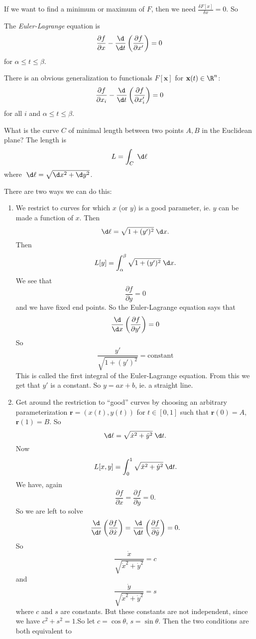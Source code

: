 \documentclass[a4paper]{article}
\begin{document}
If we want to find a minimum or maximum of $F$, then we need $\frac{\delta F[x]}{\delta x} = 0$. So
\begin{defi}
  The \emph{Euler-Lagrange} equation is
  \[
    \frac{\partial f}{\partial x} - \frac{\d}{\d t}\left(\frac{\partial f}{\partial  x'}\right) = 0
  \]
  for $\alpha \leq t \leq \beta$.
\end{defi}
There is an obvious generalization to functionals $F[\mathbf{x}]$  for $\mathbf{x}(t) \in \R^n$:
\[
  \frac{\partial f}{\partial x_i} - \frac{\d }{\d t}\left(\frac{\partial f}{\partial x_i'}\right) = 0
\]
for all $i$ and $\alpha \leq t \leq \beta$.
\begin{eg}
  What is the curve $C$ of minimal length between two points $A, B$ in the Euclidean plane? The length is
  \[
    L = \int_C \;\d \ell
  \]
  where $\;\d \ell = \sqrt{\d x^2 + \d y^2}$.

  There are two ways we can do this:
  \begin{enumerate}
    \item We restrict to curves for which $x$ (or $y$) is a good parameter, ie. $y$ can be made a function of $x$. Then
      \[
        \d \ell = \sqrt{1 + (y')^2}\;\d x.
      \]
      Then
      \[
        L[y] = \int_\alpha^\beta \sqrt{1 + (y')^2}\;\d x.
      \]
      We see that
      \[
        \frac{\partial f}{\partial y} = 0
      \]
      and we have fixed end points. So the Euler-Lagrange equation says that
      \[
        \frac{\d}{\d x} \left(\frac{\partial f}{\partial y'}\right) = 0
      \]
      So
      \[
        \frac{y'}{\sqrt{1 + (y')^2}} = \text{constant}
      \]
      This is called the first integral of the Euler-Lagrange equation. From this we get that $y'$ is a constant. So $y = ax + b$, ie. a straight line.
    \item Get around the restriction to ``good'' curves by choosing an arbitrary parameterization $\mathbf{r} = (x(t), y(t))$ for $t\in [0, 1]$ such that $\mathbf{r}(0) = A$, $\mathbf{r}(1) = B$. So
      \[
        \d \ell = \sqrt{\dot x^2 + \dot y^2}\;\d t.
      \]
      Now
      \[
        L[x, y] = \int_0^1 \sqrt{\dot x^2 + \dot y^2} \;\d t.
      \]
      We have, again
      \[
        \frac{\partial f}{\partial x} = \frac{\partial f}{\partial y} = 0.
      \]
      So we are left to solve
      \[
        \frac{\d }{\d t}\left(\frac{\partial f}{\partial \dot x}\right) = \frac{\d }{\d t}\left(\frac{\partial f}{\partial \dot y}\right)  = 0.
      \]
      So
      \[
        \frac{\dot x}{\sqrt{\dot x^2 + \dot y^2}} = c
      \]
      and
      \[
        \frac{\dot y}{\sqrt{\dot x^2 + \dot y^2}} = s
      \]
      where $c$ and $s$ are constants. But these constants are not independent, since we have $c^2 + s^2 = 1$.So let $c = \cos \theta$, $s = \sin \theta$. Then the two conditions are both equivalent to
       

\end{enumerate}
\end{eg}
\end{document}

